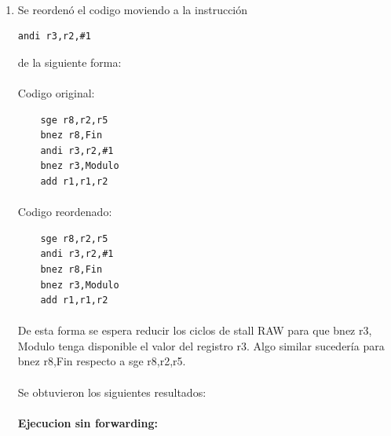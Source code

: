 \documentclass[a4paper,11pt]{article}
\begin{document}
\begin{enumerate}
\item

\paragraph{} 
Se reorden\'o el codigo moviendo a la instrucci\'on 

\begin{verbatim}
andi r3,r2,#1 
\end{verbatim}


de la siguiente forma:

\paragraph{}
Codigo original:

\begin{center}
\begin{verbatim}
	sge r8,r2,r5
	bnez r8,Fin 
	andi r3,r2,#1 
	bnez r3,Modulo 
	add r1,r1,r2
\end{verbatim}
\end{center}

\paragraph{} 
Codigo reordenado:

\begin{center}
\begin{verbatim}
	sge r8,r2,r5 
	andi r3,r2,#1 
	bnez r8,Fin 	 
	bnez r3,Modulo 
	add r1,r1,r2
\end{verbatim}
\end{center}

\paragraph{}
De esta forma se espera reducir los ciclos de stall RAW para que bnez r3, Modulo tenga disponible el valor del registro r3. Algo similar sucedería para bnez r8,Fin respecto a sge r8,r2,r5.

\paragraph{}
Se obtuvieron los siguientes resultados:

\paragraph{Ejecucion sin forwarding:}


\end{enumerate}
\end{document}

